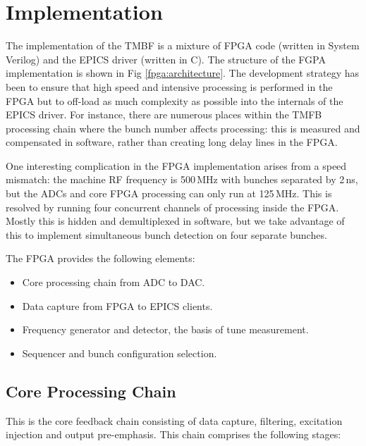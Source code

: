 \documentclass{JAC2003}
\begin{document}
\section{Implementation}

The implementation of the TMBF is a mixture of FPGA code (written in System
Verilog) and the EPICS driver (written in C).  The structure of the FGPA
implementation is shown in Fig \ref{fpga:architecture}.  The development
strategy has been to ensure that high speed and intensive processing is
performed in the FPGA but to off-load as much complexity as possible into the
internals of the EPICS driver.  For instance, there are numerous places within
the TMFB processing chain where the bunch number affects processing: this is
measured and compensated in software, rather than creating long delay lines in
the FPGA.

One interesting complication in the FPGA implementation arises from a speed
mismatch: the machine RF frequency is 500\,MHz with bunches separated by 2\,ns,
but the ADCs and core FPGA processing can only run at 125\,MHz.  This is
resolved by running four concurrent channels of processing inside the FPGA.
Mostly this is hidden and demultiplexed in software, but we take advantage of
this to implement simultaneous bunch detection on four separate bunches.

The FPGA provides the following elements:
\begin{itemize}
\item Core processing chain from ADC to DAC.
\item Data capture from FPGA to EPICS clients.
\item Frequency generator and detector, the basis of tune measurement.
\item Sequencer and bunch configuration selection.
\end{itemize}

\subsection{Core Processing Chain}

This is the core feedback chain consisting of data capture, filtering,
excitation injection and output pre-emphasis.  This chain comprises the
following stages:
\end{document}
